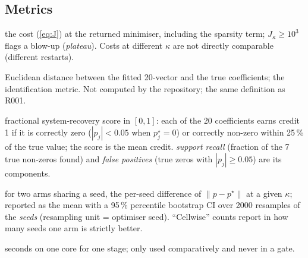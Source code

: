 \documentclass[10pt]{article}
\newcommand{\pstar}{p^\star}
\newcommand{\perr}{\lVert p - \pstar\rVert}
\begin{document}
\subsection{Metrics}
\begin{description}[leftmargin=1.6em, itemsep=1pt]
\item[$J_\kappa$ (primary)] the cost (\ref{eq:J}) at the returned minimiser, including the sparsity term; $J_\kappa\ge10^3$ flags a blow-up (\emph{plateau}). Costs at different $\kappa$ are not directly comparable (different restarts).
\item[$\perr$] Euclidean distance between the fitted 20-vector and the true coefficients; the identification metric. Not computed by the repository; the same definition as R001.
\item[recovery score] fractional system-recovery score in $[0,1]$: each of the 20 coefficients earns credit 1 if it is correctly zero ($|p_j|<0.05$ when $\pstar_j=0$) or correctly non-zero within 25\,\% of the true value; the score is the mean credit. \emph{support recall} (fraction of the 7 true non-zeros found) and \emph{false positives} (true zeros with $|p_j|\ge0.05$) are its components.
\item[paired difference] for two arms sharing a seed, the per-seed difference of $\perr$ at a given $\kappa$; reported as the mean with a 95\,\% percentile bootstrap CI over 2000 resamples of the \emph{seeds} (resampling unit = optimiser seed). ``Cellwise'' counts report in how many seeds one arm is strictly better.
\item[wall time] seconds on one core for one stage; only used comparatively and never in a gate.
\end{description}
\end{document}

